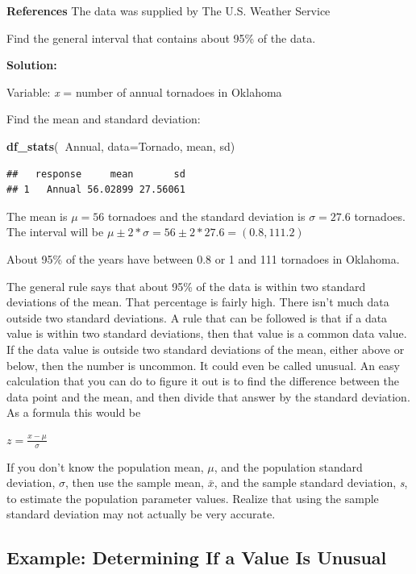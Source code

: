 \documentclass[
]{book}
\newenvironment{Shaded}{\begin{snugshade}}{\end{snugshade}}
\newcommand{\DataTypeTok}[1]{\textcolor[rgb]{0.13,0.29,0.53}{#1}}
\newcommand{\KeywordTok}[1]{\textcolor[rgb]{0.13,0.29,0.53}{\textbf{#1}}}
\newcommand{\NormalTok}[1]{#1}
\newcommand{\OperatorTok}[1]{\textcolor[rgb]{0.81,0.36,0.00}{\textbf{#1}}}
\begin{document}
\textbf{References}
The data was supplied by The U.S. Weather Service

Find the general interval that contains about 95\% of the data.

\textbf{Solution:}

Variable: \emph{x} = number of annual tornadoes in Oklahoma

Find the mean and standard deviation:

\begin{Shaded}
\begin{Highlighting}[]
\KeywordTok{df_stats}\NormalTok{(}\OperatorTok{~}\NormalTok{Annual, }\DataTypeTok{data=}\NormalTok{Tornado, mean, sd)}
\end{Highlighting}
\end{Shaded}

\begin{verbatim}
##   response     mean       sd
## 1   Annual 56.02899 27.56061
\end{verbatim}

The mean is \(\mu=56\) tornadoes and the standard deviation is \(\sigma=27.6\) tornadoes. The interval will be \(\mu\pm2*\sigma=56\pm2*27.6=(0.8,111.2)\)

About 95\% of the years have between 0.8 or 1 and 111 tornadoes in Oklahoma.

The general rule says that about 95\% of the data is within two standard deviations of the mean. That percentage is fairly high. There isn't much data outside two standard deviations. A rule that can be
followed is that if a data value is within two standard deviations, then that value is a common data value. If the data value is outside two standard deviations of the mean, either above or below, then the number is uncommon. It could even be called unusual. An easy calculation that you can do to figure it out is to find the difference between the data point and the mean, and then divide that answer by the standard
deviation. As a formula this would be

\(z=\frac{x-\mu}{\sigma}\)

If you don't know the population mean, \(\mu\), and the population standard deviation, \(\sigma\), then use the sample mean, \(\bar{x}\), and the sample standard deviation, \emph{s}, to estimate the population parameter values. Realize that using the sample standard deviation may not actually be very accurate.

\hypertarget{example-determining-if-a-value-is-unusual}{%
\subsection{Example: Determining If a Value Is Unusual}\label{example-determining-if-a-value-is-unusual}}
\end{document}
